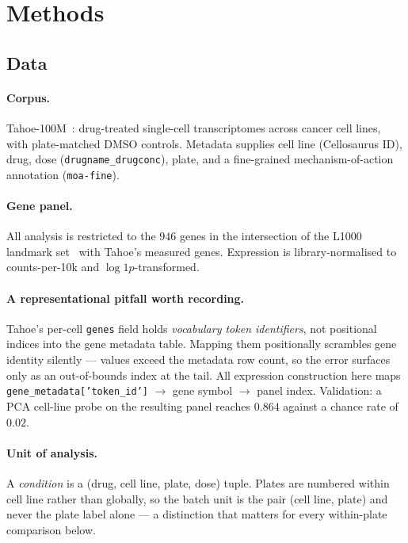 \section{Methods}
\label{sec:methods}

\subsection{Data}
\label{sec:methods-data}

\paragraph{Corpus.} Tahoe-100M~\cite{tahoe100m}: drug-treated single-cell transcriptomes across
cancer cell lines, with plate-matched DMSO controls. Metadata supplies cell line
(Cellosaurus ID), drug, dose (\texttt{drugname\_drugconc}), plate, and a fine-grained
mechanism-of-action annotation (\texttt{moa-fine}).

\paragraph{Gene panel.} All analysis is restricted to the $946$ genes in the intersection of the
L1000 landmark set~\cite{l1000} with Tahoe's measured genes. Expression is library-normalised to
counts-per-10k and $\log1p$-transformed.

\paragraph{A representational pitfall worth recording.} Tahoe's per-cell \texttt{genes} field holds
\emph{vocabulary token identifiers}, not positional indices into the gene metadata table. Mapping
them positionally scrambles gene identity silently --- values exceed the metadata row count, so the
error surfaces only as an out-of-bounds index at the tail. All expression construction here maps
\texttt{gene\_metadata['token\_id']} $\rightarrow$ gene symbol $\rightarrow$ panel index.
Validation: a PCA cell-line probe on the resulting panel reaches $0.864$ against a chance rate of
$0.02$.

\paragraph{Unit of analysis.} A \emph{condition} is a (drug, cell line, plate, dose) tuple. Plates
are numbered within cell line rather than globally, so the batch unit is the pair (cell line, plate)
and never the plate label alone --- a distinction that matters for every within-plate comparison
below.

